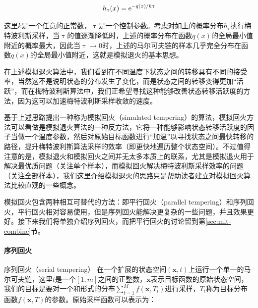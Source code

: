 \begin{equation}
	h_{\uptau}(x)={\rm e}^{-q(x)/k\uptau}
\end{equation}

\noindent 这里$k$是一个任意的正常数，$\uptau$是一个控制参数。考虑对如上的概率分布$h_{\uptau}$执行梅特波利斯采样，当$\uptau$的值逐渐降低时，上述的概率分布在函数$q(x)$的全局最小值附近的概率最大，因此当$\uptau\to 0$时，上述的马尔可夫链的样本几乎完全分布在函数$q(x)$的全局最小值附近，这就是模拟退火的基本思想。

在上述模拟退火算法中，我们看到在不同温度下状态之间的转移具有不同的接受率，当然这不是说明状态的分布发生了变化，而是状态之间的转移变得更加“活跃”，而在梅特波利斯算法中，我们正希望寻找这种能够改善状态转移活跃度的方法，因为这可以加速梅特波利斯采样收敛的速度。

\cite{a:SimulatedTempering:ANewMonteCarloScheme}基于上述思路提出一种称为模拟回火（simulated tempering）的算法，模拟回火方法可以看做是模拟退火算法的一种反方法，它将一种能够影响状态转移活跃度的因子当做一个温度参数，然后对原始目标函数进行“加温”以寻找状态之间最快转移的路径，提升梅特波利斯算法采样的效率（即更快地遍历整个状态空间）。不过值得注意的是，模拟退火和模拟回火之间并无太多本质上的联系，尤其是模拟退火用于解决最优质问题（关注单个样本），而模拟回火解决梅特波利斯采样效率的问题（关注全部样本），我们这里介绍模拟退火的思路只是帮助读者建立对模拟回火算法比较直观的一些概念。

模拟回火包含两种相互可替代的方法：即平行回火（parallel tempering）和序列回火，平行回火\cite{a:markovchainmontecarlomaximumlikelihoodfordependentdata}相对容易使用，但是序列回火能解决更复杂的一些问题，并且效果更好。接下来我们将单独介绍序列回火，而把平行回火的讨论留到第\ref{sec:mlt-combine}节。




\paragraph{序列回火}
序列回火（serial tempering）
\cite{a:SimulatedTempering:ANewMonteCarloScheme,a:AnnealingMarkovChainMonteCarlowithApplicationstoAncestralInference,b:HandbookofMarkovChainMonteCarlo}在一个扩展的状态空间$(\mathbf{x},t)$上运行一个单一的马尔可夫链，这里$t$是一个$[1,m]$之间的正整数，$\mathbf{x}$表示目标函数的原始状态空间，我们的目标是要对一个和形式的分布$\sum^{M}_{t=1}f(\mathbf{x},T_t)$进行采样，$T_t$称为目标分布函数$f(\mathbf{x},T)$的参数。原始采样函数可以表示为：

